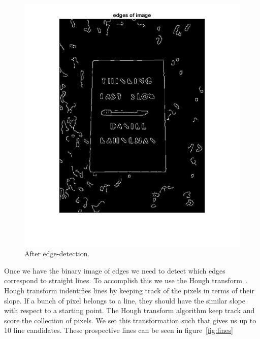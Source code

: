 \begin{figure}[t]
\begin{center}
   \includegraphics[width=0.8\linewidth]{figures/edgeDetection.jpg}
\end{center}
\caption{After edge-detection.}
\label{fig:edge}
\end{figure}

Once we have the binary image of edges we need to detect which edges correspond to straight lines.
To accomplish this we use the Hough transform~\cite{hough}.
Hough transform indentifies lines by keeping track of the pixels in terms of their slope.
If a bunch of pixel belongs to a line, they should have the similar slope with respect to a starting point.
The Hough transform algorithm keep track and score the collection of pixels.
We set this transformation such that gives us up to 10 line candidates.
These prospective lines can be seen in figure~\ref{fig:lines}

